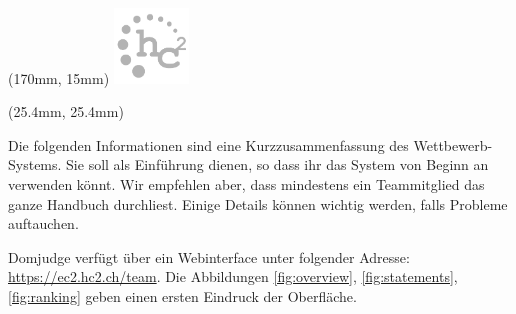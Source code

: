 \begin{textblock*}{20mm}(170mm, 15mm)
\includegraphics[width=20mm]{hc2logogray.pdf}
\end{textblock*}

\begin{textblock*}{50mm}(25.4mm, 25.4mm)
\noindent \textcolor{gray}{\langinfo \\ \textbf{\taskinfo} }
\end{textblock*}


\newcommand{\heveaonly}[1]{#1}
\renewcommand{\heveaonly}[1]{}

\noindent Die folgenden Informationen sind eine Kurzzusammenfassung des
Wettbewerb-Systems. Sie soll als Einführung dienen, so dass ihr das System von
Beginn an verwenden könnt. Wir empfehlen aber, dass mindestens ein Teammitglied
das ganze Handbuch durchliest. Einige Details können wichtig werden, falls
Probleme auftauchen.

Domjudge verfügt über ein Webinterface unter folgender Adresse:
\url{https://ec2.hc2.ch/team}.
Die Abbildungen \ref{fig:overview}, \ref{fig:statements}, \ref{fig:ranking}
geben einen ersten Eindruck der Oberfläche.


